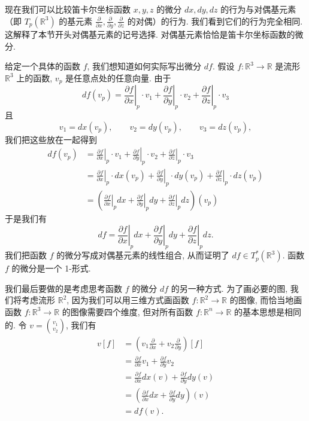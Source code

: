 现在我们可以比较笛卡尔坐标函数 $x,y,z$ 的微分 $dx,dy,dz$ 的行为与对偶基元素（即 $T_p(\mathbb{R}^3)$ 的基元素 $\frac{\partial}{\partial x},\frac{\partial}{\partial y},\frac{\partial}{\partial z}$ 的对偶）的行为. 我们看到它们的行为完全相同. 这解释了本节开头对偶基元素的记号选择. 对偶基元素恰恰是笛卡尔坐标函数的微分.

给定一个具体的函数 $f$, 我们想知道如何实际写出微分 $df$. 假设 $f:\mathbb{R}^3\to\mathbb{R}$ 是流形 $\mathbb{R}^3$ 上的函数, $v_p$ 是任意点处的任意向量. 由于
\[
df(v_p)=\left.\frac{\partial f}{\partial x}\right|_{p}\cdot v_1+\left.\frac{\partial f}{\partial y}\right|_{p}\cdot v_2+\left.\frac{\partial f}{\partial z}\right|_{p}\cdot v_3
\]
且
\[
v_1=dx(v_p),\qquad v_2=dy(v_p),\qquad v_3=dz(v_p),
\]
我们把这些放在一起得到
\begin{align*}
df(v_p)&=\left.\frac{\partial f}{\partial x}\right|_{p}\cdot v_1+\left.\frac{\partial f}{\partial y}\right|_{p}\cdot v_2+\left.\frac{\partial f}{\partial z}\right|_{p}\cdot v_3\\
&=\left.\frac{\partial f}{\partial x}\right|_{p}\cdot dx(v_p)+\left.\frac{\partial f}{\partial y}\right|_{p}\cdot dy(v_p)+\left.\frac{\partial f}{\partial z}\right|_{p}\cdot dz(v_p)\\
&=\left(\left.\frac{\partial f}{\partial x}\right|_{p}dx+\left.\frac{\partial f}{\partial y}\right|_{p}dy+\left.\frac{\partial f}{\partial z}\right|_{p}dz\right)(v_p)
\end{align*}
于是我们有
\[
df=\left.\frac{\partial f}{\partial x}\right|_{p}dx+\left.\frac{\partial f}{\partial y}\right|_{p}dy+\left.\frac{\partial f}{\partial z}\right|_{p}dz.
\]
我们把函数 $f$ 的微分写成对偶基元素的线性组合, 从而证明了 $df\in T_p^*(\mathbb{R}^3)$. 函数 $f$ 的微分是一个 1-形式.

我们最后要做的是考虑思考函数 $f$ 的微分 $df$ 的另一种方式. 为了画必要的图, 我们将考虑流形 $\mathbb{R}^2$, 因为我们可以用三维方式画函数 $f:\mathbb{R}^2\to\mathbb{R}$ 的图像, 而恰当地画函数 $f:\mathbb{R}^3\to\mathbb{R}$ 的图像需要四个维度, 但对所有函数 $f:\mathbb{R}^n\to\mathbb{R}$ 的基本思想是相同的. 令 $v=\binom{v_1}{v_2}$, 我们有
\begin{align*}
v[f]&=\left(v_1\frac{\partial}{\partial x}+v_2\frac{\partial}{\partial y}\right)[f]\\
&=\frac{\partial f}{\partial x}v_1+\frac{\partial f}{\partial y}v_2\\
&=\frac{\partial f}{\partial x}dx(v)+\frac{\partial f}{\partial y}dy(v)\\
&=\left(\frac{\partial f}{\partial x}dx+\frac{\partial f}{\partial y}dy\right)(v)\\
&=df(v).
\end{align*}

